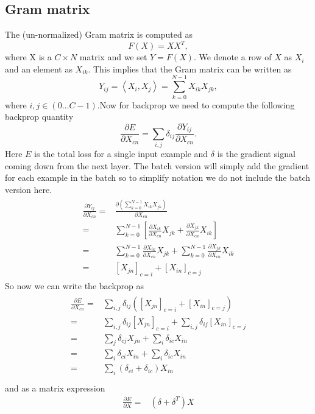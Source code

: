 \documentclass[a4paper]{article}
\begin{document}
\subsection{Gram matrix}
The (un-normalized) Gram matrix is computed as
\begin{equation}
F(X)=XX^T,
\end{equation}
where X is a $C\times N$ matrix and we set $Y=F(X)$. We denote a row of $X$ as $X_i$ and an element as $X_{ik}$. This implies that the Gram matrix can be written as
\begin{equation}
Y_{ij}=\left \langle X_i,X_j \right \rangle = \sum_{k=0}^{N-1} X_{ik} X_{jk},
\end{equation}
where $i,j \in (0\dots C-1)$.Now for backprop we need to compute the following backprop quantity
\begin{equation}
\frac{\partial{E}}{\partial{X_{cn}}} = \sum_{i,j}\delta_{ij} \frac{\partial{Y_{ij}}}{\partial{X_{cn}}}.
\end{equation}
Here $E$ is the total loss for a single input example and $\delta$ is the gradient signal coming down from the next layer. The batch version will simply add the gradient for each example in the batch so to simplify notation we do not include the batch version here. 
\begin{align}
\begin{split}
 \frac{\partial{Y_{ij}}}{\partial{X_{cn}}} = & \frac{ \partial \left (\sum_{k=0}^{N-1}X_{ik}X_{jk}\right )  }{\partial{X_{cn}}}\\ 
 = & \sum_{k=0}^{N-1} \left [ \frac{\partial{X_{ik}}}{\partial{X_{cn}}} X_{jk} + \frac{\partial{X_{jk}}}{\partial{X_{cn}}} X_{ik} \right ]\\ 
 = & \sum_{k=0}^{N-1} \frac{\partial{X_{ik}}}{\partial{X_{cn}}} X_{jk} + \sum_{k=0}^{N-1} \frac{\partial{X_{jk}}}{\partial{X_{cn}}} X_{ik}\\ 
 = & \left [ X_{jn} \right ]_{c=i} + \left [ X_{in} \right ]_{c=j} 
\end{split}
\end{align}
So now we can write the backprop as
\begin{align}
\begin{split}
 \frac{\partial{E}}{\partial{X_{cn}}}  = &  
 \sum_{i,j} \delta_{ij} \left (\left [ X_{jn} \right ]_{c=i} + \left [ X_{in} \right ]_{c=j} \right )\\ 
  = & \sum_{i,j} \delta_{ij} \left [ X_{jn} \right ]_{c=i} + \sum_{i,j} \delta_{ij} \left [ X_{in} \right ]_{c=j} \\ 
  = &  \sum_{j} \delta_{cj} X_{jn} + \sum_{i} \delta_{ic}  X_{in} \\
  = &  \sum_{i} \delta_{ci} X_{in} + \sum_{i} \delta_{ic}  X_{in} \\
  = &  \sum_{i}  \left ( \delta_{ci}  + \delta_{ic}  \right) X_{in}\\
  \end{split}
\end{align}
and as a matrix expression
\begin{align}
 \frac{\partial{E}}{\partial{X}}  = & (\delta +\delta^T)X
\end{align}

\newpage


    
\end{document}
